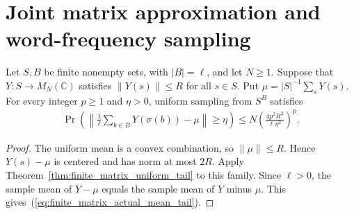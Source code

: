 \section{Joint matrix approximation and word-frequency sampling}

\begin{theorem}
    \label{thm:finite_matrix_actual_mean_tail}
    \leanok
    Let $S,B$ be finite nonempty sets, with $|B|=\ell$, and let $N\ge1$.
    Suppose that $Y:S\to M_N(\mathbb C)$ satisfies $\|Y(s)\|\le R$ for all
    $s\in S$. Put $\mu=|S|^{-1}\sum_sY(s)$. For every integer $p\ge1$
    and $\eta>0$, uniform sampling from $S^B$ satisfies
    \begin{align}
        \Pr\left(\left\|\frac1\ell\sum_{b\in B}Y(\sigma(b))-\mu\right\|\ge\eta\right)
        \le N\left(\frac{4p^2R^2}{\ell\eta^2}\right)^p.
        \label{eq:finite_matrix_actual_mean_tail}
    \end{align}
\end{theorem}
\begin{proof}\leanok
    The uniform mean is a convex combination, so $\|\mu\|\le R$.
    Hence $Y(s)-\mu$ is centered and has norm at most $2R$.
    Apply Theorem~\ref{thm:finite_matrix_uniform_tail} to this family.
    Since $\ell>0$, the sample mean of $Y-\mu$ equals the sample mean
    of $Y$ minus $\mu$. This gives~(\ref{eq:finite_matrix_actual_mean_tail}).
\end{proof}


